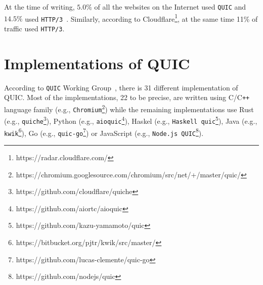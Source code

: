 \documentclass[12pt,a4paper,twoside,openright]{report}
\begin{document}
At the time of writing, $5.0\%$ of all the websites on the Internet used \texttt{QUIC} and $14.5\%$ used \texttt{HTTP/3}~\cite{bib_Adoption_comparison_Between_http2_http3_quic}.
Similarly, according to Cloudflare\footnote{https://radar.cloudflare.com/}, at the same time 11\% of traffic used \texttt{HTTP/3}.



\section{Implementations of QUIC} \label{List_of_QUIC_implementations}
According to \texttt{QUIC} Working Group~\cite{number_of_QUIC_implementations}, there is 31 different implementation of QUIC. Most of the implementations, 22 to be precise, are written using C/C\texttt{++} language family (e.g., \texttt{Chromium}\footnote{https://chromium.googlesource.com/chromium/src/net/+/master/quic/}) while the remaining implementations use Rust (e.g., \texttt{quiche}\footnote{https://github.com/cloudflare/quiche}), Python (e.g., \texttt{aioquic}\footnote{https://github.com/aiortc/aioquic}), Haskel (e.g., \texttt{Haskell quic}\footnote{https://github.com/kazu-yamamoto/quic}), Java (e.g., \texttt{kwik}\footnote{https://bitbucket.org/pjtr/kwik/src/master/}), Go (e.g., \texttt{quic-go}\footnote{https://github.com/lucas-clemente/quic-go}) or JavaScript (e.g., \texttt{Node.js QUIC}\footnote{https://github.com/nodejs/quic}).
\end{document}
